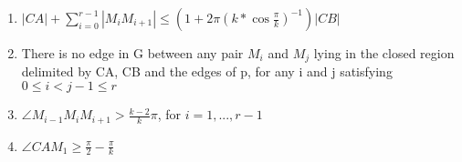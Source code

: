 \begin{enumerate}
\item $|CA| + \sum\nolimits_{i=0}^{r-1} |M_iM_{i+1}| \leq (1+2\pi (k*\cos{\frac{\pi}{k}})^{-1})|CB| $
\item There is no edge in G between any pair $M_i $ and $M_j $ lying in the closed region delimited by CA, CB and the edges of p, for any i and j satisfying $0 \leq i < j-1 \leq r $ 
\item $\angle{M_{i-1}M_iM_{i+1}} > \frac{k-2}{k}\pi $, for $i=1, ..., r-1 $ 
\item $\angle{CAM_1} \geq \frac{\pi}{2}-\frac{\pi}{k} $
\end{enumerate}


